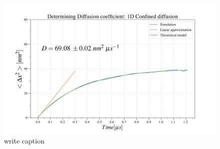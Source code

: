 \begin{figure}[ht!]
\begin{center}
  \includegraphics[width=\textwidth]{Figures/MR-100-diff.png}
  \caption{write caption}
\end{center}
\end{figure}
